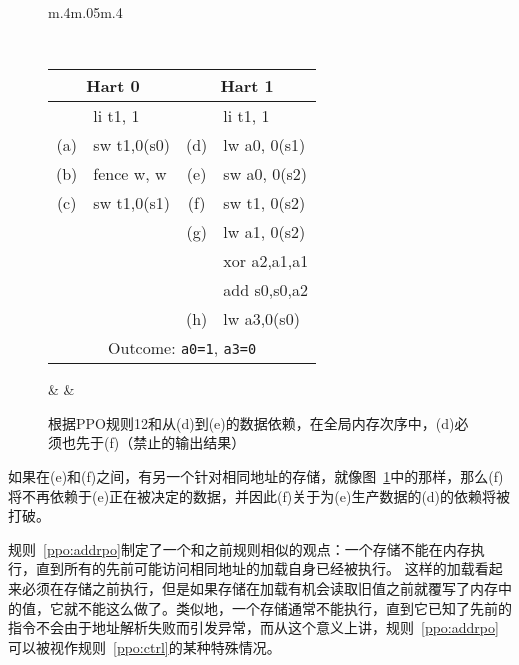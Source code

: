 \begin{figure}[h!]
  \centering
  \begin{tabular}{m{.4\linewidth}m{.05\linewidth}m{.4\linewidth}}
  {
    \tt\small
    \begin{tabular}{cl||cl}
    \multicolumn{2}{c}{Hart 0} & \multicolumn{2}{c}{Hart 1} \\
    \hline
          & li t1, 1    &     & li t1, 1       \\
      (a) & sw t1,0(s0) & (d) & lw a0, 0(s1)   \\
      (b) & fence w, w  & (e) & sw a0, 0(s2)   \\
      (c) & sw t1,0(s1) & (f) & sw t1, 0(s2)   \\
          &             & (g) & lw a1, 0(s2)   \\
          &             &     & xor a2,a1,a1   \\
          &             &     & add s0,s0,a2   \\
          &             & (h) & lw a3,0(s0)    \\   

      \hline
      \multicolumn{4}{c}{Outcome: {\tt a0=1}, {\tt a3=0}}
    \end{tabular}
  } & &
  
  \end{tabular}

  \caption{根据PPO规则12和从(d)到(e)的数据依赖，在全局内存次序中，(d)必须也先于(f)（禁止的输出结果）
    }
  \label{fig:litmus:addrdatarfi_no}
\end{figure}

如果在(e)和(f)之间，有另一个针对相同地址的存储，就像图~\ref{fig:litmus:addrdatarfi_no}中的那样，那么(f)将不再依赖于(e)正在被决定的数据，并因此(f)关于为(e)生产数据的(d)的依赖将被打破。

规则~\ref{ppo:addrpo}制定了一个和之前规则相似的观点：一个存储不能在内存执行，直到所有的先前可能访问相同地址的加载自身已经被执行。
这样的加载看起来必须在存储之前执行，但是如果存储在加载有机会读取旧值之前就覆写了内存中的值，它就不能这么做了。类似地，一个存储通常不能执行，直到它已知了先前的指令不会由于地址解析失败而引发异常，而从这个意义上讲，规则~\ref{ppo:addrpo}可以被视作规则~\ref{ppo:ctrl}的某种特殊情况。

